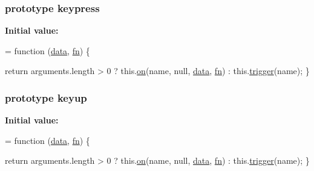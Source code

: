 \subsubsection[{\texorpdfstring{keypress}{keypress}}]{ {\bf prototype} keypress}\hypertarget{jquery-2_82_81-vsdoc_8js_a617a8713f64ec1d97c7abe00cbae31e4}{}\label{jquery-2_82_81-vsdoc_8js_a617a8713f64ec1d97c7abe00cbae31e4}
{\bfseries Initial value\+:}
\begin{DoxyCode}
= \textcolor{keyword}{function} (\hyperlink{jquery-2_82_81-vsdoc_8js_a609407b3456fdc3c5671a9fc4a226ff7}{data}, \hyperlink{jquery-2_82_81-vsdoc_8js_acef6bdaf6b9b20fdcca1ea86f0902c3b}{fn}) \{
        

        \textcolor{keywordflow}{return} arguments.length > 0 ?
            this.\hyperlink{jquery-2_82_81-vsdoc_8js_ae453b412b883f60220d73468ef6c6dbc}{on}(name, null, \hyperlink{jquery-2_82_81-vsdoc_8js_a609407b3456fdc3c5671a9fc4a226ff7}{data}, \hyperlink{jquery-2_82_81-vsdoc_8js_acef6bdaf6b9b20fdcca1ea86f0902c3b}{fn}) :
            this.\hyperlink{jquery-2_82_81-vsdoc_8js_a2388c4114d5e3e4eab020f973641519c}{trigger}(name);
    \}
\end{DoxyCode}
\subsubsection[{\texorpdfstring{keyup}{keyup}}]{ {\bf prototype} keyup}\hypertarget{jquery-2_82_81-vsdoc_8js_a807aea8640f7889d0e97428a1ee2c637}{}\label{jquery-2_82_81-vsdoc_8js_a807aea8640f7889d0e97428a1ee2c637}
{\bfseries Initial value\+:}
\begin{DoxyCode}
= \textcolor{keyword}{function} (\hyperlink{jquery-2_82_81-vsdoc_8js_a609407b3456fdc3c5671a9fc4a226ff7}{data}, \hyperlink{jquery-2_82_81-vsdoc_8js_acef6bdaf6b9b20fdcca1ea86f0902c3b}{fn}) \{
        

        \textcolor{keywordflow}{return} arguments.length > 0 ?
            this.\hyperlink{jquery-2_82_81-vsdoc_8js_ae453b412b883f60220d73468ef6c6dbc}{on}(name, null, \hyperlink{jquery-2_82_81-vsdoc_8js_a609407b3456fdc3c5671a9fc4a226ff7}{data}, \hyperlink{jquery-2_82_81-vsdoc_8js_acef6bdaf6b9b20fdcca1ea86f0902c3b}{fn}) :
            this.\hyperlink{jquery-2_82_81-vsdoc_8js_a2388c4114d5e3e4eab020f973641519c}{trigger}(name);
    \}
\end{DoxyCode}
